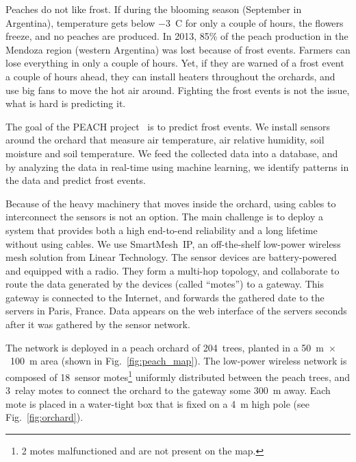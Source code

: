 \documentclass{elsarticle}
\newcommand{\smip}                {SmartMesh~IP\xspace}
\begin{document}

Peaches do not like frost.
If during the blooming season (September in Argentina), temperature gets below $-$3~C for only a couple of hours, the flowers freeze, and no peaches are produced.
In 2013, 85\% of the peach production in the Mendoza region (western Argentina) was lost because of frost events.
Farmers can lose everything in only a couple of hours.
Yet, if they are warned of a frost event a couple of hours ahead, they can install heaters throughout the orchards, and use big fans to move the hot air around.
Fighting the frost events is not the issue, what is hard is predicting it.


The goal of the PEACH project~\cite{watteyne16peach} is to predict frost events.
We install sensors around the orchard that measure air temperature, air relative humidity, soil moisture and soil temperature.
We feed the collected data into a database, and by analyzing the data in real-time using machine learning, we identify patterns in the data and predict frost events.


Because of the heavy machinery that moves inside the orchard, using cables to interconnect the sensors is not an option.
The main challenge is to deploy a system that provides both a high end-to-end reliability and a long lifetime without using cables.
We use \smip, an off-the-shelf low-power wireless mesh solution from Linear Technology.
The sensor devices are battery-powered and equipped with a radio.
They form a multi-hop topology, and collaborate to route the data generated by the devices (called ``motes'') to a gateway.
This gateway is connected to the Internet, and forwards the gathered date to the servers in Paris, France.
Data appears on the web interface of the servers seconds after it was gathered by the sensor network.


The network is deployed in a peach orchard of 204~trees, planted in a 50~m~$\times$~100~m area (shown in Fig.~\ref{fig:peach_map}).
The low-power wireless network is composed of 18~sensor motes\footnote{2 motes malfunctioned and are not present on the map.} uniformly distributed between the peach trees, and 3~relay motes to connect the orchard to the gateway some 300~m away.
Each mote is placed in a water-tight box that is fixed on a 4~m high pole (see Fig.~\ref{fig:orchard}).
\end{document}
